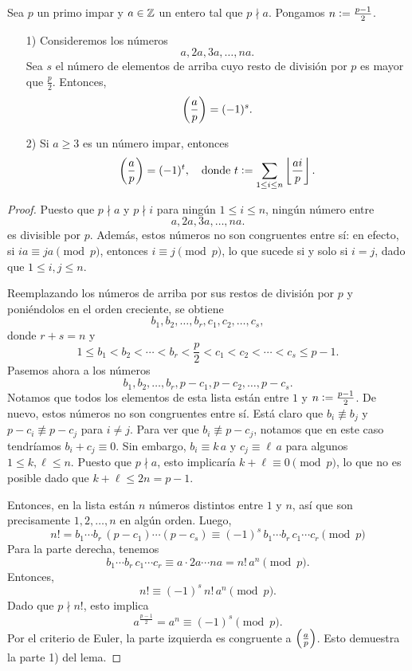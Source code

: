 \documentclass{article}
\theoremstyle{plain}
\begin{document}
\begin{lema}
  Sea $p$ un primo impar y $a\in \mathbb{Z}$ un entero tal que $p\nmid a$. Pongamos
  $n \mathrel{\mathop:}= \frac{p-1}{2}$.

  \begin{enumerate}
  \item[1)] Consideremos los números
    $$a, 2a, 3a, \ldots, na.$$
    Sea $s$ el número de elementos de arriba cuyo resto de división por $p$ es
    mayor que $\frac{p}{2}$. Entonces,
    $$\left(\frac{a}{p}\right) = (-1)^s.$$

  \item[2)] Si $a \ge 3$ es un número impar, entonces
    $$\left(\frac{a}{p}\right) = (-1)^t, \quad \text{donde }t \mathrel{\mathop:}= \sum_{1 \le i \le n} \left\lfloor\frac{ai}{p}\right\rfloor.$$
  \end{enumerate}

  \begin{proof}
    Puesto que $p \nmid a$ y $p \nmid i$ para ningún $1 \le i \le n$, ningún
    número entre
    $$a, 2a, 3a, \ldots, na.$$
    es divisible por $p$. Además, estos números no son congruentes entre sí: en
    efecto, si $i a \equiv j a \pmod{p}$, entonces $i \equiv j \pmod{p}$, lo que
    sucede si y solo si $i = j$, dado que $1 \le i, j \le n$.

    Reemplazando los números de arriba por sus restos de división por $p$ y
    poniéndolos en el orden creciente, se obtiene
    $$b_1, b_2, \ldots, b_r, c_1, c_2, \ldots, c_s,$$
    donde $r+s = n$ y
    $$1 \le b_1 < b_2 < \cdots < b_r < \frac{p}{2} < c_1 < c_2 < \cdots < c_s \le p-1.$$
    Pasemos ahora a los números
    \begin{equation}
      \label{eqn:lema-de-gauss-lista}
      b_1, b_2, \ldots, b_r, p-c_1, p-c_2, \ldots, p-c_s.
    \end{equation}
    Notamos que todos los elementos de esta lista están entre $1$ y
    $n \mathrel{\mathop:}= \frac{p-1}{2}$. De nuevo, estos números no son congruentes entre
    sí. Está claro que $b_i \not\equiv b_j$ y $p - c_i \not\equiv p - c_j$ para
    $i \ne j$. Para ver que $b_i \not\equiv p - c_j$, notamos que en este caso
    tendríamos $b_i + c_j \equiv 0$. Sin embargo, $b_i \equiv k\,a$ y
    $c_j \equiv \ell\,a$ para algunos $1 \le k,\ell \le n$. Puesto que
    $p\nmid a$, esto implicaría $k + \ell \equiv 0 \pmod{p}$, lo que no es
    posible dado que $k+\ell \le 2n = p-1$.

    Entonces, en la lista  están $n$ números
    distintos entre $1$ y $n$, así que son precisamente $1,2,\ldots,n$ en algún
    orden. Luego,
    $$n! = b_1\cdots b_r\, (p-c_1)\cdots (p-c_s) \equiv (-1)^s\,b_1\cdots b_r\,c_1\cdots c_r \pmod{p}$$
    Para la parte derecha, tenemos
    $$b_1\cdots b_r\,c_1\cdots c_r \equiv a\cdot 2a\cdots na = n!\,a^n \pmod{p}.$$
    Entonces,
    $$n! \equiv (-1)^s\,n!\,a^n \pmod{p}.$$
    Dado que $p\nmid n!$, esto implica
    $$a^{\frac{p-1}{2}} = a^n \equiv (-1)^s \pmod{p}.$$
    Por el criterio de Euler, la parte izquierda es congruente a
    $\left(\frac{a}{p}\right)$. Esto demuestra la parte 1) del lema.


\end{proof}
\end{lema}
\end{document}

